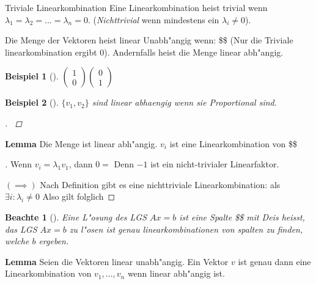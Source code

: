 \documentclass[11pt]{article}
\newtheorem{exa}{Beispiel}[section]
\newtheorem*{notte}{Beachte}
\begin{document}
\begin{definition}{Triviale Linearkombination}{}
Eine Linearkombination heist trivial wenn \(\lambda_1 = \lambda_2 = ... =
\lambda_n = 0\). (\emph{Nichttrivial} wenn mindestens ein \(\lambda_i\not= 0\)).
\end{definition}


\begin{definition}{}{}
Die Menge der Vektoren heist linear Unabh"angig wenn: \$\$ (Nur die Triviale
linearkombination ergibt 0). Andernfalls heist die Menge linear abh"angig.
\end{definition}

\begin{exa}[] \label{}
\(\begin{pmatrix}1\\0\end{pmatrix}\begin{pmatrix}0\\1\end{pmatrix}\)
\end{exa}

\begin{exa}[] \label{}
\(\{v_1,v_2\}\) sind linear abhaengig wenn sie Proportional sind.

\begin{proof}[] \label{}

\end{proof}
\end{exa}

\textbf{Lemma} Die Menge ist linear abh"angig. \(v_i\) ist eine Linearkombination von \$\$

\begin{proof}[] \label{}
Wenn \(v_i=\lambda_1 v_1\), dann \(0=\) Denn \(-1\) ist ein nicht-trivialer
Linearfaktor.

\((\implies)\) Nach Definition gibt es eine nichttriviale Linearkombination: als
\(\exists i : \lambda_i \not= 0\) Also gilt  folglich 
\end{proof}

\begin{notte}[] \label{}
Eine L"osung des LGS \(Ax=b\) ist eine Spalte \$\$ mit 
Deis heisst, das LGS \(Ax=b\) zu l"osen ist genau linearkombinationen von spalten
zu finden, welche \(b\) ergeben.
\end{notte}

\textbf{Lemma} Seien die Vektoren linear unabh"angig. Ein Vektor \(v\) ist genau dann
eine Linearkombination von \(v_1,...,v_n\) wenn linear abh"angig ist.
\end{document}
